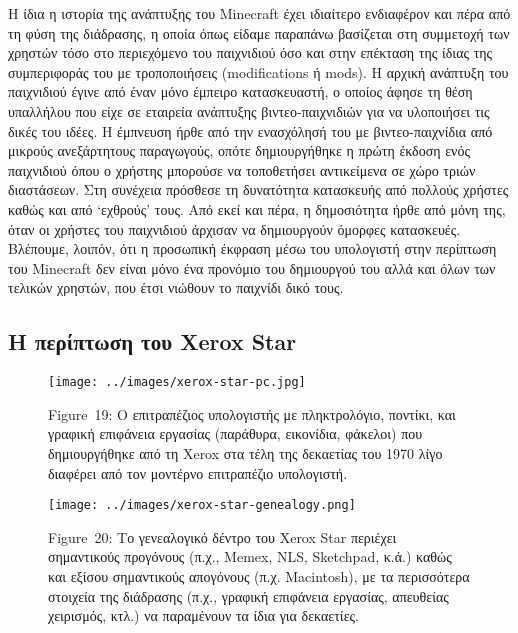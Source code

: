 \documentclass[
]{article}
\begin{document}
Η ίδια η ιστορία της ανάπτυξης του Minecraft έχει ιδιαίτερο ενδιαφέρον
και πέρα από τη φύση της διάδρασης, η οποία όπως είδαμε παραπάνω
βασίζεται στη συμμετοχή των χρηστών τόσο στο περιεχόμενο του παιχνιδιού
όσο και στην επέκταση της ίδιας της συμπεριφοράς του με τροποποιήσεις
(modifications ή mods). Η αρχική ανάπτυξη του παιχνιδιού έγινε από έναν
μόνο έμπειρο κατασκευαστή, ο οποίος άφησε τη θέση υπαλλήλου που είχε σε
εταιρεία ανάπτυξης βιντεο-παιχνιδιών για να υλοποιήσει τις δικές του
ιδέες. Η έμπνευση ήρθε από την ενασχόλησή του με βιντεο-παιχνίδια από
μικρούς ανεξάρτητους παραγωγούς, οπότε δημιουργήθηκε η πρώτη έκδοση ενός
παιχνιδιού όπου ο χρήστης μπορούσε να τοποθετήσει αντικείμενα σε χώρο
τριών διαστάσεων. Στη συνέχεια πρόσθεσε τη δυνατότητα κατασκευής από
πολλούς χρήστες καθώς και από `εχθρούς' τους. Από εκεί και πέρα, η
δημοσιότητα ήρθε από μόνη της, όταν οι χρήστες του παιχνιδιού άρχισαν να
δημιουργούν όμορφες κατασκευές. Βλέπουμε, λοιπόν, ότι η προσωπική
έκφραση μέσω του υπολογιστή στην περίπτωση του Minecraft δεν είναι μόνο
ένα προνόμιο του δημιουργού του αλλά και όλων των τελικών χρηστών, που
έτσι νιώθουν το παιχνίδι δικό τους.

\hypertarget{ux3b7-ux3c0ux3b5ux3c1ux3afux3c0ux3c4ux3c9ux3c3ux3b7-ux3c4ux3bfux3c5-xerox-star}{%
\subsection{Η περίπτωση του Xerox
Star}\label{ux3b7-ux3c0ux3b5ux3c1ux3afux3c0ux3c4ux3c9ux3c3ux3b7-ux3c4ux3bfux3c5-xerox-star}}

\leavevmode{}%
\begin{figure}
\hypertarget{fig:xerox-star-pc}{%
\centering
\texttt{[image: ../images/xerox-star-pc.jpg]}
\caption{Figure~19: Ο επιτραπέζιος υπολογιστής με πληκτρολόγιο, ποντίκι,
και γραφική επιφάνεια εργασίας (παράθυρα, εικονίδια, φάκελοι) που
δημιουργήθηκε από τη Xerox στα τέλη της δεκαετίας του 1970 λίγο διαφέρει
από τον μοντέρνο επιτραπέζιο υπολογιστή.}\label{fig:xerox-star-pc}
}
\end{figure}

\leavevmode{}%
\begin{figure}
\hypertarget{fig:xerox-star-genealogy}{%
\centering
\texttt{[image: ../images/xerox-star-genealogy.png]}
\caption{Figure~20: Το γενεαλογικό δέντρο του Xerox Star περιέχει
σημαντικούς προγόνους (π.χ., Memex, NLS, Sketchpad, κ.ά.) καθώς και
εξίσου σημαντικούς απογόνους (π.χ. Macintosh), με τα περισσότερα
στοιχεία της διάδρασης (π.χ., γραφική επιφάνεια εργασίας, απευθείας
χειρισμός, κτλ.) να παραμένουν τα ίδια για
δεκαετίες.}\label{fig:xerox-star-genealogy}
}
\end{figure}
\end{document}
